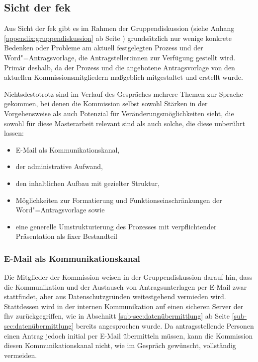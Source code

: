 \documentclass[a4paper,12pt,twoside]{scrreprt}
\begin{document}
\subsection{Sicht der \acl{fek}}
\label{sub-sec:probleme-sicht-fek}

Aus Sicht der \acl{fek} gibt es im Rahmen der Gruppendiskussion (siehe Anhang \ref{appendix:gruppendiskussion} ab Seite \pageref{appendix:gruppendiskussion}) grundsätzlich nur wenige konkrete Bedenken oder Probleme am aktuell festgelegten Prozess und der Word"=Antragsvorlage, die Antragsteller:innen zur Verfügung gestellt wird. Primär deshalb, da der Prozess und die angebotene Antragsvorlage von den aktuellen Kommissionsmitgliedern maßgeblich mitgestaltet und erstellt wurde.

Nichtsdestotrotz sind im Verlauf des Gespräches mehrere Themen zur Sprache gekommen, bei denen die Kommission selbst sowohl Stärken in der Vorgehensweise als auch Potenzial für Veränderungsmöglichkeiten sieht, die sowohl für diese Masterarbeit relevant sind als auch solche, die diese unberührt lassen:
\begin{itemize}
    \item E-Mail als Kommunikationskanal,
    \item der administrative Aufwand,
    \item den inhaltlichen Aufbau mit gezielter Struktur,
    \item Möglichkeiten zur Formatierung und Funktionseinschränkungen der Word"=Antragsvorlage sowie
    \item eine generelle Umstrukturierung des Prozesses mit verpflichtender Präsentation als fixer Bestandteil
\end{itemize}

\subsubsection*{E-Mail als Kommunikationskanal}
\label{sub-sub-sec:email-kommunikationskanal}

Die Mitglieder der Kommission weisen in der Gruppendiskussion darauf hin, dass die Kommunikation und der Austausch von Antragsunterlagen per E-Mail zwar stattfindet, aber aus Datenschutzgründen weitestgehend vermieden wird. Stattdessen wird in der internen Kommunikation auf einen sicheren Server der \acl{fhv} zurückgegriffen, wie in Abschnitt \ref{sub-sec:datenübermittlung} ab Seite \ref{sub-sec:datenübermittlung} bereits angesprochen wurde. Da antragsstellende Personen einen Antrag jedoch initial per E-Mail übermitteln müssen, kann die Kommission diesen Kommunikationskanal nicht, wie im Gespräch gewünscht, vollständig vermeiden.
\end{document}
